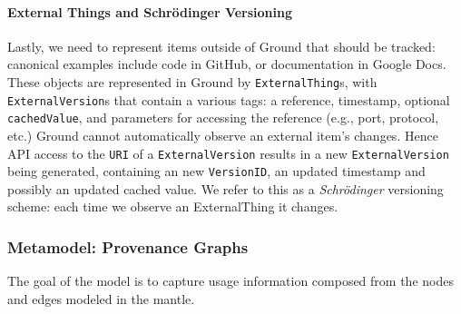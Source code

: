 \documentclass{sig-alternate}
\begin{document}
\paragraph{External Things and Schr\"{o}dinger Versioning}
Lastly, we need to represent items outside of Ground that should be tracked: canonical examples
include code in GitHub, or documentation in Google Docs. These objects are represented in Ground by \texttt{ExternalThing}s, with \texttt {ExternalVersion}s that contain a various tags: a \uri reference,  timestamp, optional \texttt{cachedValue}, and parameters for accessing the
reference (e.g., port, protocol, etc.)
Ground cannot automatically observe an external item's changes. Hence
API access to the \texttt{URI}
of a \texttt{ExternalVersion} results in a new \texttt{ExternalVersion} being generated, containing an new
\texttt{VersionID}, an updated timestamp and possibly an updated cached value.  We refer to this as a \emph{Schr\"{o}dinger} versioning scheme: each time we observe an ExternalThing it changes.


\subsubsection{\Crust Metamodel: Provenance Graphs}

The goal of the \crust model is to capture usage information composed from the nodes and edges modeled in the mantle.  
\end{document}
